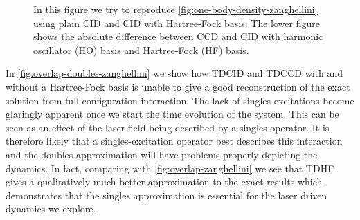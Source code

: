 \begin{figure}
            \caption{In this figure we try to reproduce
            \autoref{fig:one-body-density-zanghellini} using plain CID and CID with
            Hartree-Fock basis.
            The lower figure shows the absolute difference between CCD and CID
            with harmonic oscillator (HO) basis and Hartree-Fock (HF) basis.}
            \label{fig:one-body-density-doubles-zanghellini}
        \end{figure}

        In \autoref{fig:overlap-doubles-zanghellini} we show how TDCID and TDCCD
        with and without a Hartree-Fock basis is unable to give a good
        reconstruction of the exact solution from full configuration
        interaction.
        The lack of singles excitations become glaringly apparent once we start
        the time evolution of the system.
        This can be seen as an effect of the laser field being described by a
        singles operator.
        It is therefore likely that a singles-excitation operator best describes
        this interaction and the doubles approximation will have problems
        properly depicting the dynamics.
        In fact, comparing with \autoref{fig:overlap-zanghellini} we see that
        TDHF gives a qualitatively much better approximation to the exact
        results which demonstrates that the singles approximation is essential
        for the laser driven dynamics we explore.


